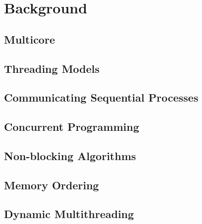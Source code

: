 

\chapter{Background}
\label{ch:background}

\section{Multicore}
\section{Threading Models} 
\section{Communicating Sequential Processes}
\section{Concurrent Programming}
\section{Non-blocking Algorithms}
\section{Memory Ordering}
\section{Dynamic Multithreading}
